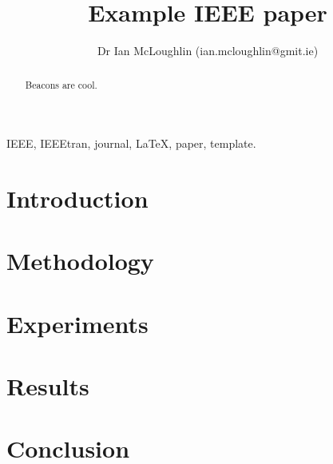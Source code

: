 \documentclass[journal]{IEEEtran}
\title{Example IEEE paper}
\subtitle{}
\author{Dr Ian McLoughlin (ian.mcloughlin@gmit.ie)}
\institute{Department and University Name}
\date{}
\begin{document}
\begin{abstract}
	Beacons are cool.
\end{abstract}

\begin{IEEEkeywords}
IEEE, IEEEtran, journal, \LaTeX, paper, template.
\end{IEEEkeywords}


\section{Introduction}

\section{Methodology}

\section{Experiments}

\section{Results}

\section{Conclusion}

\end{document}
